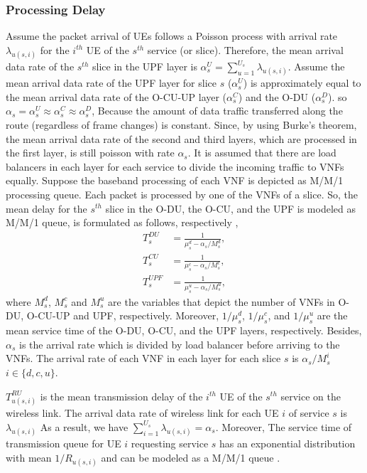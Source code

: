 \documentclass[lettersize,journal]{IEEEtran}
\begin{document}
\subsubsection{Processing Delay}
Assume the packet arrival of UEs follows a Poisson process with arrival rate $\lambda_{u(s,i)}$ for the $i^{th}$ UE of the $s^{th}$ service (or slice).
Therefore, the mean arrival data rate of the $s^{th}$ slice in the UPF layer is $\alpha_{s}^U = \sum_{u=1}^{U_s}\lambda_{u(s,i)}$.
Assume the mean arrival data rate of the UPF layer for slice $s$ ($\alpha_{s}^U$) is approximately equal to the mean arrival data rate of the O-CU-UP layer ($\alpha_{s}^C$) and the O-DU ($\alpha_{s}^D$). so $\alpha_{s} =\alpha_{s}^U \approx \alpha_{s}^C \approx \alpha_{s}^D$,
Because the amount of data traffic transferred along the route (regardless of frame changes) is constant.
Since, by using Burke’s theorem, the mean arrival data rate of the second and third layers, which are processed in the first layer, is still poisson with rate $\alpha_{s}$.
It is assumed that there are load balancers in each layer for each service to divide the incoming traffic to VNFs equally. %
Suppose the baseband processing of each VNF is depicted as M/M/1 processing queue.
Each packet is processed by one of the VNFs of a slice. So, the mean delay for the $s^{th}$ slice in the O-DU, the O-CU, and the UPF is modeled as M/M/1 queue, is formulated as follows, respectively \cite{SystemCostMinimization,luong2018joint,luong2018novel},
\begin{equation}
\begin{split}
T_{s}^{DU} &= \frac{1}{\mu_s^d - \alpha_{s}/{M_s^{d}}},\\
T_{s}^{CU} &= \frac{1}{\mu_s^c - \alpha_{s}/{M_s^{c}}},\\
T_{s}^{UPF} &= \frac{1}{\mu_s^u - \alpha_{s}/{M_s^{u}}},
\end{split}
\end{equation}
where $M_s^{d}$, $M_s^{c}$ and 
$M_s^{u}$ are the variables that depict the number of VNFs in O-DU, O-CU-UP and UPF, respectively. 
Moreover, $1/\mu_s^d$, $1/\mu_s^c$, and $1/\mu_s^u$ are the mean service time of the O-DU, O-CU, and the UPF layers, respectively.
Besides, $\alpha_{s}$ is the  arrival rate which is divided
by load balancer before arriving to the VNFs. The arrival rate of each VNF in each layer for each slice 
$s$ is $\alpha_{s}/{M_s^{i}}$ $ i \in \{d,c, u\}$.

$T_{u(s,i)}^{RU}$ is the mean transmission delay of the $i^{th}$ UE of the $s^{th}$ service on the wireless link.
 The arrival data rate of wireless link for each UE $i$ of service $s$ is $\lambda_{u(s,i)}$
As a result, we have $\sum_{i = 1}^{U_s} \lambda_{u(s,i)} = \alpha_s$.
Moreover, The service time of transmission queue for UE $i$ requesting service $s$ has
an exponential distribution with mean $1/R_{u(s,i)}$ and can be modeled as a M/M/1 queue \cite{SystemCostMinimization,luong2018joint,luong2018novel}.
 
\end{document}
